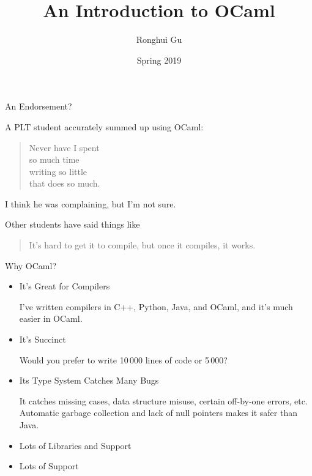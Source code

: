 \documentclass{plt}
\title{An Introduction to OCaml}
\author{Ronghui Gu}
\institute{Columbia University}
\date{Spring 2019}
\begin{document}
\frame{\titlepage}




\begin{frame}{An Endorsement?}

A PLT student accurately summed up using OCaml:

\begin{quote}
Never have I spent \\ so much time \\ writing so little \\ that does so much.
\end{quote}

I think he was complaining, but I'm not sure.

Other students have said things like

\begin{quote}
It's hard to get it to compile, but once it compiles, it works.
\end{quote}

\end{frame}

\begin{frame}{Why OCaml?}

  \begin{itemize}
  \item \alert{It's Great for Compilers}

    I've written compilers in C++, Python, Java, and OCaml, and it's much
    easier in OCaml.

  \item \alert{It's Succinct}

    Would you prefer to write 10\,000 lines of code or 5\,000?
    
  \item \alert{Its Type System Catches Many Bugs}

    It catches missing cases, data structure misuse, certain off-by-one
    errors, etc.  Automatic garbage collection and lack of null pointers
    makes it safer than Java.
    
  \item \alert{Lots of Libraries and Support}
  

  \item \alert{ Lots of Support}
    

\end{itemize}
\end{frame}
\end{document}
